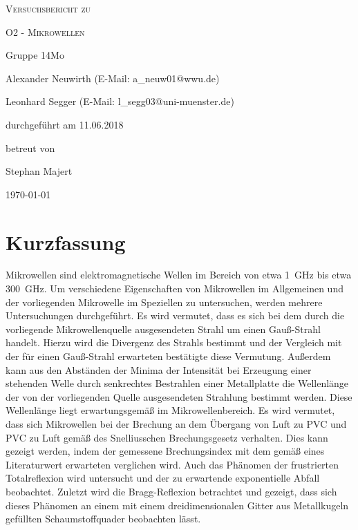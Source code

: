\documentclass[
	a4paper,
	12pt,
	pagesize,
	ngerman
]{scrartcl}
\begin{document}
	
	\begin{titlepage}
		\centering
		{\scshape\LARGE Versuchsbericht zu \par}
		\vspace{1cm}
		{\scshape\huge O2 - Mikrowellen \par}
		\vspace{2.5cm}
		{\LARGE Gruppe 14Mo \par}
		\vspace{0.5cm}
		
		{\large Alexander Neuwirth (E-Mail: a\_neuw01@wwu.de) \par}
		{\large Leonhard Segger (E-Mail: l\_segg03@uni-muenster.de) \par}
		\vfill
		
		durchgeführt am 11.06.2018\par
		betreut von\par
		{\large Stephan Majert}
		
		\vfill
		
		{\large \today\par}
	\end{titlepage}
	\tableofcontents
	\newpage


	\section{Kurzfassung}
	Mikrowellen sind elektromagnetische Wellen im Bereich von etwa \SI{1}{\giga \Hz} bis etwa \SI{300}{\giga \hertz}.
	Um verschiedene Eigenschaften von Mikrowellen im Allgemeinen und der vorliegenden Mikrowelle im Speziellen zu untersuchen, werden mehrere Untersuchungen durchgeführt.
	Es wird vermutet, dass es sich bei dem durch die vorliegende Mikrowellenquelle ausgesendeten Strahl um einen Gauß-Strahl handelt.
	Hierzu wird die Divergenz des Strahls bestimmt und der Vergleich mit der für einen Gauß-Strahl erwarteten bestätigte diese Vermutung.
	Außerdem kann aus den Abständen der Minima der Intensität bei Erzeugung einer stehenden Welle durch senkrechtes Bestrahlen einer Metallplatte die Wellenlänge der von der vorliegenden Quelle ausgesendeten Strahlung bestimmt werden.
	Diese Wellenlänge liegt erwartungsgemäß im Mikrowellenbereich.
	Es wird vermutet, dass sich Mikrowellen bei der Brechung an dem Übergang von Luft zu PVC und PVC zu Luft gemäß des Snelliusschen Brechungsgesetz verhalten.
	Dies kann gezeigt werden, indem der gemessene Brechungsindex mit dem gemäß eines Literaturwert erwarteten verglichen wird.
	Auch das Phänomen der frustrierten Totalreflexion wird untersucht und der zu erwartende exponentielle Abfall beobachtet.
	Zuletzt wird die Bragg-Reflexion betrachtet und gezeigt, dass sich dieses Phänomen an einem mit einem dreidimensionalen Gitter aus Metallkugeln gefüllten Schaumstoffquader beobachten lässt.
	
\end{document}
